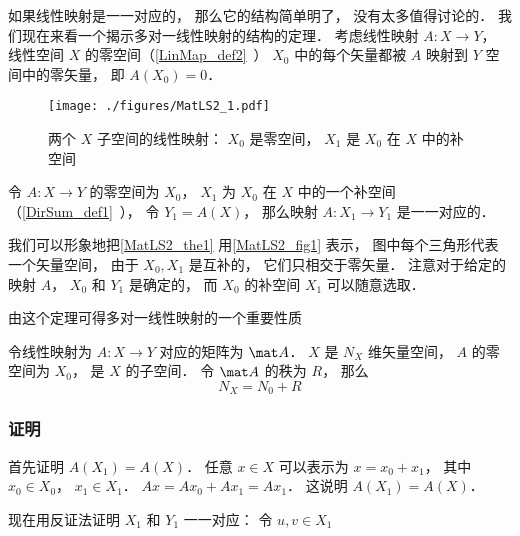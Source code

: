 

如果线性映射是一一对应的， 那么它的结构简单明了， 没有太多值得讨论的． 我们现在来看一个揭示多对一线性映射的结构的定理． 考虑线性映射 $A:X\to Y$， 线性空间 $X$ 的零空间（\autoref{LinMap_def2}~） $X_0$ 中的每个矢量都被 $A$ 映射到 $Y$ 空间中的零矢量， 即 $A(X_0) = \qty{0}$．

\begin{figure}[ht]
\centering
\texttt{[image: ./figures/MatLS2\_1.pdf]}
\caption{两个 $X$ 子空间的线性映射： $X_0$ 是零空间， $X_1$ 是 $X_0$ 在 $X$ 中的补空间} \label{MatLS2_fig1}
\end{figure}

\begin{theorem}{}\label{MatLS2_the1}
令 $A:X \to Y$ 的零空间为 $X_0$， $X_1$ 为 $X_0$ 在 $X$ 中的一个补空间（\autoref{DirSum_def1}~）， 令 $Y_1 = A(X)$， 那么映射 $A:X_1\to Y_1$ 是一一对应的．
\end{theorem}
我们可以形象地把\autoref{MatLS2_the1} 用\autoref{MatLS2_fig1} 表示， 图中每个三角形代表一个矢量空间， 由于 $X_0, X_1$ 是互补的， 它们只相交于零矢量． 注意对于给定的映射 $A$， $X_0$ 和 $Y_1$ 是确定的， 而 $X_0$ 的补空间 $X_1$ 可以随意选取．

由这个定理可得多对一线性映射的一个重要性质
\begin{corollary}{}
令线性映射为 $A:X\to Y$ 对应的矩阵为 $\mat A$． $X$ 是 $N_X$ 维矢量空间， $A$ 的零空间为 $X_0$， 是 $X$ 的子空间． 令 $\mat A$ 的秩为 $R$， 那么
\begin{equation}
N_X = N_0 + R
\end{equation}
\end{corollary}


\subsubsection{证明}

首先证明 $A(X_1) = A(X)$． 任意 $x\in X$ 可以表示为 $x = x_0 + x_1$， 其中 $x_0\in X_0$， $x_1\in X_1$． $Ax = A x_0 + A x_1 = A x_1$． 这说明 $A(X_1) = A(X)$．

现在用反证法证明 $X_1$ 和 $Y_1$ 一一对应： 令 $u, v \in X_1$
